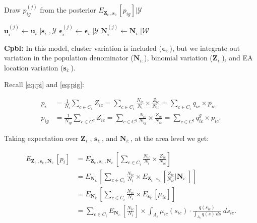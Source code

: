 \documentclass[12pt]{article}
\begin{document}
\begin{algorithm}[H]
\caption{Draw $p_{ig}^{(j)}$ from the posterior $E_{\boldsymbol{Z}_{i:},\boldsymbol{s}_{i:}}[p_{ig}] \vert  \mathscr{Y}$}
\label{alg:main}
\begin{algorithmic}[1]
\STATE $\boldsymbol{u}_{i:}^{(j)} \leftarrow \boldsymbol{u}_{i:} \vert \mathbf{s}_{i:}, \mathscr{Y}$
\STATE $\boldsymbol{ \epsilon }_{i:}^{(j)} \leftarrow \boldsymbol{ \epsilon }_{i:}  \vert  \mathscr{Y} $
\STATE $\mathbf{N}_{i:}^{(j)} \leftarrow \mathbf{N}_{i:} \vert \mathscr{W}$
\end{algorithmic}
\end{algorithm}

\medskip
\noindent
\textbf{Cpbl:} In this model, cluster variation is included ($\boldsymbol{ \epsilon }_{i:}$), but we integrate out variation in the population denominator ($\boldsymbol{N}_{i:}$), binomial variation ($\boldsymbol{Z}_{i:}$), and EA location variation ($\boldsymbol{s}_{i:}$).

Recall \eqref{eq:pi} and \eqref{eq:pig}: 

\begin{align*}
p_i &= \frac{1}{N_i}\sum_{c \in C_i} Z_{ic} = \sum_{c \in C_i} \frac{N_{ic}}{N_i}  \times \frac{Z_{ic}}{N_{ic}}  =  \sum_{c \in C_i} q_{ic} \times p_{ic} \\
p_{ig} &= \frac{1}{N_{ig}} \sum_{c \in C^g} Z_{ic} = \sum_{c \in C^g} \frac{N_{ic}}{N_{ig}}  \times \frac{Z_{ic}}{N_{ic}}  =  \sum_{c \in C^g} q_{ic}^g \times p_{ic}.
\end{align*}

Taking expectation over $\boldsymbol{Z}_{i:}$,  $\boldsymbol{s}_{i:}$, and $\boldsymbol{N}_{i:}$, at the area level we get: 

\begin{align*}
E_{\boldsymbol{Z}_{i:}, \boldsymbol{s}_{i:}, \boldsymbol{N}_{i:}} \left [p_i \right ] &= E_{\boldsymbol{Z}_{i:}, \boldsymbol{s}_{i:}, \boldsymbol{N}_{i:}} \left [\sum_{c \in C_i} \frac{N_{ic}}{N_i}  \times \frac{Z_{ic}}{N_{ic}}  \right ] \\
&= E_{\boldsymbol{N}_{i:}} \left [\sum_{c \in C_i} \frac{N_{ic}}{N_i}  \times E_{\boldsymbol{Z}_{i:}, \boldsymbol{s}_{i:}} \left [ \frac{Z_{ic}}{N_{ic}} \Big \vert \boldsymbol{N}_{i:} \right ]  \right ] \\
&= E_{\boldsymbol{N}_{i:}} \left [\sum_{c \in C_i} \frac{N_{ic}}{N_i}  \times E_{\boldsymbol{s}_{i:}} [\mu_{ic}]  \right ] \\
&= \sum_{c \in C_i} E_{\boldsymbol{N}_{i:}} \left [ \frac{N_{ic}}{N_i} \right ] \times \int_{A_i} \mu_{ic}(s_{ic}) \cdot \frac{q(s_{ic})}{\int_{A_i} q(s) \ ds} \ ds_{ic}.  \\
\end{align*}
\end{document}
